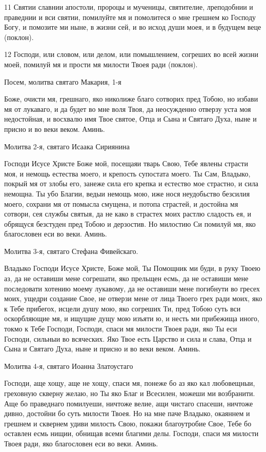 11 Святии славнии апостоли, пророцы и мученицы, святителие, лреподобнии и праведнии и вси святии, помилуйте мя и помолитеся о мне грешнем ко Господу Богу, и помозите ми ныне, в жизни сей, и во исход души моея, и в будущем веце (поклон).

12 Господи, или словом, или делом, или помышлением, согреших во всей жизни моей, помилуй мя и прости мя милости Твоея ради (поклон).


Посем, молитва святаго Макария, 1-я

Боже, очисти мя, грешнаго, яко николиже благо сотворих пред Тобою, но избави мя от лукаваго, и да будет во мне воля Твоя, да неосужденно отверзу уста моя недостойная, и восхвалю имя Твое святое, Отца и Сына и Святаго Духа, ныне и присно и во веки веком. Аминь.


Молитва 2-я, святаго Исаака Сириянина

Господи Исусе Христе Боже мой, посещаяи тварь Свою, Тебе явлены страсти моя, и немощь естества моего, и крепость супостата моего. Ты Сам, Владыко, покрый мя от злобы его, занеже сила его крепка и естество мое страстно, и сила немощна. Ты убо Благии, ведыи немощь мою, иже нося неудобьство безсилия моего, сохрани мя от помысла смущена, и потопа страстей, и достойна мя сотвори, сея службы святыя, да не како в страстех моих растлю сладость ея, и обрящуся безстуден пред Тобою и дерзостив. Но милостию Си помилуй мя, яко благословен еси во веки. Аминь.


Молитва 3-я, святаго Стефана Фивейскаго.

Владыко Господи Исусе Христе, Боже мой, Ты Помощник ми буди, в руку Твоею аз, да не оставиши мене согрешати, яко прельщен есмь, да не оставиши мене последовати хотению моему лукавому, да не оставиши мене погибнути во гресех моих, ущедри создание Свое, не отверзи мене от лица Твоего грех ради моих, яко к Тебе прибегох, исцели душу мою, яко согреших Ти, пред Тобою суть вси оскорбляющие мя, и ищущие дущу мою изъяти ю, и несть ми прибежища иного, токмо к Тебе Господи, Господи, спаси мя милости Твоея ради, яко Ты еси Господи, сильныи во всяческих. Яко Твое есть Царство и сила и слава, Отца и Сына и Святаго Духа, ныне и присно и во веки веком. Аминь.


Молитва 4-я, святаго Иоанна Златоустаго

Господи, аще хощу, аще не хощу, спаси мя, понеже бо аз яко кал любовещныи, греховную скверну желаю, но Ты яко Благ и Всесилен, можеши ми возбранити. Аще бо праведнаго помилуеши, ничтоже велие, ащи чистаго спасеши, ничтоже дивно, достойни бо суть милости Твоея. Но на мне паче Владыко, окаяннем и грешнем и сквернем удиви милость Свою, покажи благоутробие Свое, Тебе бо оставлен есмь нищии, обнищав всеми благими делы. Господи, спаси мя милости Твоея ради, яко благословен еси во веки. Аминь.



